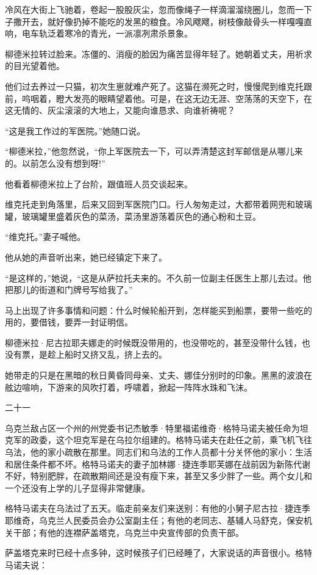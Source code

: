 冷风在大街上飞驰着，卷起一股股灰尘，忽而像绳子一样滴溜溜绕圈儿，忽而一下子撒开去，就好像扔掉不能吃的发黑的粮食。冷风飕飕，树枝像敲骨头一样嘎嘎直响，电车轨泛着寒冷的青光，一派凛冽肃杀景象。

柳德米拉转过脸来。冻僵的、消瘦的脸因为痛苦显得年轻了。她朝着丈夫，用祈求的目光望着他。

他们过去养过一只猫，初次生崽就难产死了。这猫在濒死之时，慢慢爬到维克托跟前，呜咽着，瞪大发亮的眼睛望着他。可是，在这无边无涯、空荡荡的天空下，在这无情的、灰尘滚滚的大地上，又能向谁恳求、向谁祈祷呢？

“这是我工作过的军医院。”她随口说。

“柳德米拉，”他忽然说，“你上军医院去一下，可以弄清楚这封军邮信是从哪儿来的。以前怎么没有想到呀!”

他看着柳德米拉上了台阶，跟值班人员交谈起来。

维克托走到角落里，后来又回到军医院门口。行人匆匆走过，大都带着网兜和玻璃罐，玻璃罐里盛着灰色的菜汤，菜汤里游荡着灰色的通心粉和土豆。

“维克托。”妻子喊他。

他从她的声音听出来，她已经镇定下来了。

“是这样的，”她说，“这是从萨拉托夫来的。不久前一位副主任医生上那儿去过。他把那儿的街道和门牌号写给我了。”

马上出现了许多事情和问题：什么时候轮船开到，怎样能买到船票，要带一些吃的用的，要借钱，要弄一封证明信。

柳德米拉·尼古拉耶夫娜走的时候既没带用的，也没带吃的，甚至没带什么钱，也没有票，是趁上船时又挤又乱，挤上去的。

她带走的只是在黑暗的秋日黄昏同母亲、丈夫、娜佳分别时的印象。黑黑的波浪在舷边喧响，下游来的风吹打着，呼啸着，掀起一阵阵水珠和飞沫。

二十一

乌克兰敌占区一个州的州党委书记杰敏季·特里福诺维奇·格特马诺夫被任命为坦克军的政委，这个坦克军是在乌拉尔组建的。格特马诺夫在赴任之前，乘飞机飞往乌法，他的家小疏散在那里。同志们和乌法的工作人员都十分关怀他的家小：生活和居住条件都不坏。格特马诺夫的妻子加林娜·捷连季耶芙娜在战前因为新陈代谢不好，特别肥胖，在疏散期间还是没有瘦下来，甚至又多少胖了一些。两个女儿和一个还没有上学的儿子显得非常健康。

格特马诺夫在乌法过了五天。临走前亲友们来送别：有他的小舅子尼古拉·捷连季耶维奇，乌克兰人民委员会办公室副主任；有他的老同志、基辅人马舒克，保安机关干部；有他的连襟萨盖塔克，乌克兰中央宣传部的负责干部。

萨盖塔克来时已经十点多钟，这时候孩子们已经睡了，大家说话的声音很小。格特马诺夫说：

